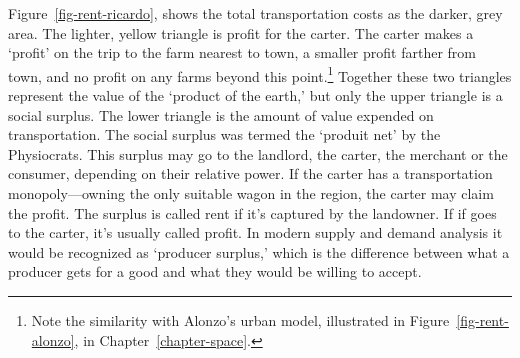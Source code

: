 Figure~\ref{fig-rent-ricardo}, shows the total transportation costs as the darker, grey area. The lighter,  yellow triangle is profit for the carter. The carter makes a `profit' on the trip to the farm nearest to town, a smaller profit farther from town, and no profit on any farms beyond this point.\footnote{Note the similarity with Alonzo's urban model, illustrated in Figure~\ref{fig-rent-alonzo}, in Chapter~\ref{chapter-space}.} 
Together these two triangles represent the  value of the `product of the earth,' but only the upper triangle is a social \gls{surplus}. The lower triangle is the amount of value expended on transportation. The social surplus was termed the `\gls{produit net}' by the Physiocrats. This surplus may go to the landlord, the carter, the merchant or the consumer, depending %
on their relative power. 
If the carter has a transportation monopoly---owning the only suitable wagon in the region, the carter may claim the profit. The surplus is called rent if it's captured by the landowner. If if goes to the carter, it's usually called profit. In modern supply and demand analysis it would be recognized as `\gls{producer surplus},' which is the difference between what a producer gets for a good and what they would be willing to accept. 



